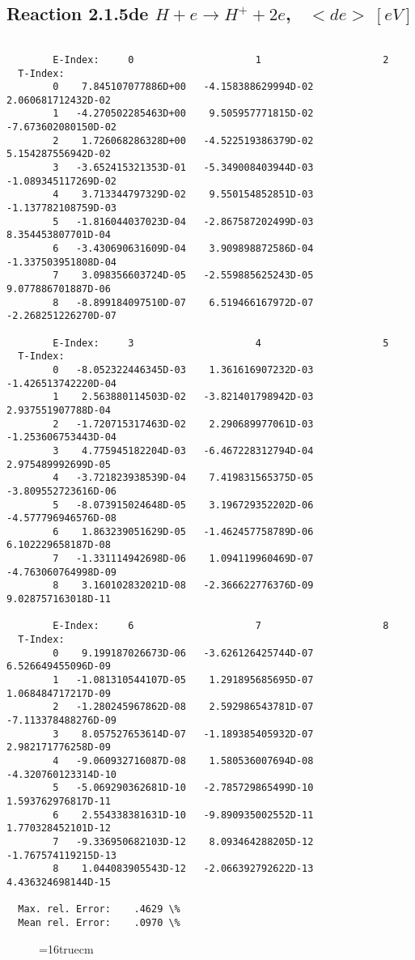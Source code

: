 \documentclass[12pt,dvipdfmx]{article}
\begin{document}
\newpage

\subsection{
Reaction 2.1.5de  $ H + e \rightarrow H^+ + 2e$, \   $<de> \ [eV]$}


\begin{small}\begin{verbatim}

        E-Index:     0                     1                     2
  T-Index:
        0    7.845107077886D+00   -4.158388629994D-02    2.060681712432D-02
        1   -4.270502285463D+00    9.505957771815D-02   -7.673602080150D-02
        2    1.726068286328D+00   -4.522519386379D-02    5.154287556942D-02
        3   -3.652415321353D-01   -5.349008403944D-03   -1.089345117269D-02
        4    3.713344797329D-02    9.550154852851D-03   -1.137782108759D-03
        5   -1.816044037023D-04   -2.867587202499D-03    8.354453807701D-04
        6   -3.430690631609D-04    3.909898872586D-04   -1.337503951808D-04
        7    3.098356603724D-05   -2.559885625243D-05    9.077886701887D-06
        8   -8.899184097510D-07    6.519466167972D-07   -2.268251226270D-07

        E-Index:     3                     4                     5
  T-Index:
        0   -8.052322446345D-03    1.361616907232D-03   -1.426513742220D-04
        1    2.563880114503D-02   -3.821401798942D-03    2.937551907788D-04
        2   -1.720715317463D-02    2.290689977061D-03   -1.253606753443D-04
        3    4.775945182204D-03   -6.467228312794D-04    2.975489992699D-05
        4   -3.721823938539D-04    7.419831565375D-05   -3.809552723616D-06
        5   -8.073915024648D-05    3.196729352202D-06   -4.577796946576D-08
        6    1.863239051629D-05   -1.462457758789D-06    6.102229658187D-08
        7   -1.331114942698D-06    1.094119960469D-07   -4.763060764998D-09
        8    3.160102832021D-08   -2.366622776376D-09    9.028757163018D-11

        E-Index:     6                     7                     8
  T-Index:
        0    9.199187026673D-06   -3.626126425744D-07    6.526649455096D-09
        1   -1.081310544107D-05    1.291895685695D-07    1.068484717217D-09
        2   -1.280245967862D-08    2.592986543781D-07   -7.113378488276D-09
        3    8.057527653614D-07   -1.189385405932D-07    2.982171776258D-09
        4   -9.060932716087D-08    1.580536007694D-08   -4.320760123314D-10
        5   -5.069290362681D-10   -2.785729865499D-10    1.593762976817D-11
        6    2.554338381631D-10   -9.890935002552D-11    1.770328452101D-12
        7   -9.336950682103D-12    8.093464288205D-12   -1.767574119215D-13
        8    1.044083905543D-12   -2.066392792622D-13    4.436324698144D-15

  Max. rel. Error:    .4629 \%
  Mean rel. Error:    .0970 \%

\end{verbatim}\end{small}
\begin{figure} \label{2.1.5li2}
\epsfxsize=16truecm
\end{figure}
\newpage
\end{document}
